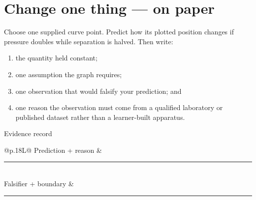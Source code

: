 \section{Change one thing --- on paper}
Choose one supplied curve point. Predict how its plotted position changes if
pressure doubles while separation is halved. Then write:
\begin{enumerate}[leftmargin=*]
\item the quantity held constant;
\item one assumption the graph requires;
\item one observation that would falsify your prediction; and
\item one reason the observation must come from a qualified laboratory or
published dataset rather than a learner-built apparatus.
\end{enumerate}

\begin{teloscard}{Evidence record}
\small
\begin{tabularx}{\linewidth}{@{}p{.18\linewidth}L@{}}
Prediction + reason & \rule{.95\linewidth}{.3pt}\\[.65em]
Falsifier + boundary & \rule{.95\linewidth}{.3pt}
\end{tabularx}
\end{teloscard}
\sourcefoot

